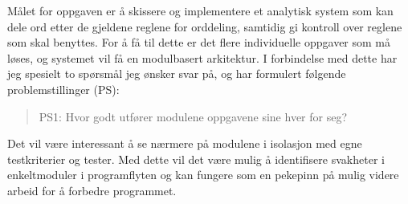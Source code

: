 


\clearpage

Målet for oppgaven er å skissere og implementere et analytisk system som kan dele ord etter de gjeldene reglene for orddeling, samtidig gi kontroll over reglene som skal benyttes. For å få til dette er det flere individuelle oppgaver som må løses, og systemet vil få en modulbasert arkitektur. I forbindelse med dette har jeg spesielt to spørsmål jeg ønsker svar på, og har formulert følgende problemstillinger (PS):

\begin{quote}
PS1: Hvor godt utfører modulene oppgavene sine hver for seg?
\end{quote}

Det vil være interessant å se nærmere på modulene i isolasjon med egne testkriterier og tester. Med dette vil det være mulig å identifisere svakheter i enkeltmoduler i programflyten og kan fungere som en pekepinn på mulig videre arbeid for å forbedre programmet.


